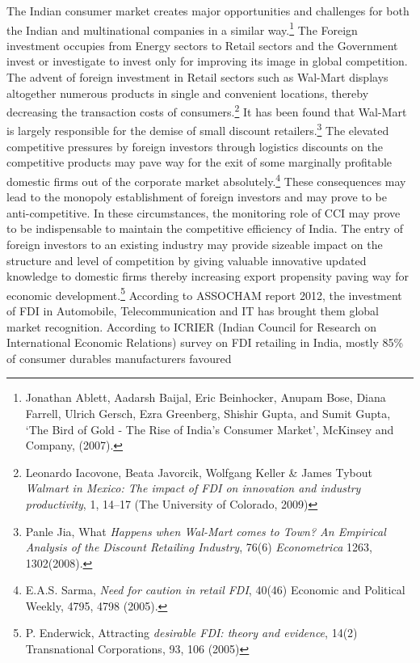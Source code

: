 \begin{multicols}{2}

\noi
The Indian consumer market creates major opportunities and challenges for both the Indian
and multinational companies in a similar way.\footnote{Jonathan Ablett, Aadarsh Baijal, Eric Beinhocker, Anupam Bose, Diana Farrell, Ulrich Gersch, Ezra
Greenberg, Shishir Gupta, and Sumit Gupta, ‘The Bird of Gold - The Rise of India's Consumer Market’,
McKinsey and Company, (2007).} The Foreign investment occupies from
Energy sectors to Retail sectors and the Government invest or investigate to invest only for
improving its image in global competition. The advent of foreign investment in Retail sectors
such as Wal-Mart displays altogether numerous products in single and convenient locations,
thereby decreasing the transaction costs of consumers.\footnote{Leonardo Iacovone, Beata Javorcik, Wolfgang Keller \& James Tybout \textit{Walmart in Mexico: The impact of
FDI on innovation and industry productivity}, 1, 14--17 (The University of Colorado, 2009)} It has been found that Wal-Mart is
largely responsible for the demise of small discount retailers.\footnote{Panle Jia, What \textit{Happens when Wal-Mart comes to Town? An Empirical Analysis of the Discount Retailing
Industry}, 76(6) \textit{Econometrica} 1263, 1302(2008).} The elevated competitive
pressures by foreign investors through logistics discounts on the competitive products may
pave way for the exit of some marginally profitable domestic firms out of the corporate
market absolutely.\footnote{E.A.S. Sarma, \textit{Need for caution in retail FDI}, 40(46) Economic and Political Weekly, 4795, 4798 (2005).} These consequences may lead to the monopoly establishment of foreign
investors and may prove to be anti-competitive. In these circumstances, the monitoring role
of CCI may prove to be indispensable to maintain the competitive efficiency of India.
The entry of foreign investors to an existing industry may provide sizeable impact on the
structure and level of competition by giving valuable innovative updated knowledge to
domestic firms thereby increasing export propensity paving way for economic
development.\footnote{P. Enderwick, Attracting \textit{desirable FDI: theory and evidence}, 14(2) Transnational Corporations, 93, 106 (2005)} According to ASSOCHAM report 2012, the investment of FDI in
Automobile, Telecommunication and IT has brought them global market recognition.
According to ICRIER (Indian Council for Research on International Economic Relations)
survey on FDI retailing in India, mostly 85\% of consumer durables manufacturers favoured

\end{multicols}

